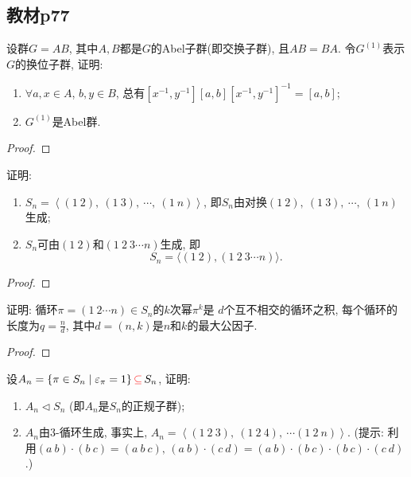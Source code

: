 \subsection{教材p77}

\begin{problem}
    设群$G = AB$, 其中$A, B$都是$G$的Abel子群(即交换子群),
且$AB = BA$. 令$G^{(1)}$表示$G$的换位子群, 证明: 
\begin{enumerate}[(1)]
    \item $\forall a, x \in A$, $b, y \in B$,
总有$[x^{-1}, y^{-1}][a, b][x^{-1}, y^{-1}]^{-1} = [a, b]$;
    \item $G^{(1)}$是Abel群.
\end{enumerate}
\end{problem}

\begin{proof}
    
\end{proof}

\begin{problem}
    证明: 
\begin{enumerate}[(1)]
    \item $S_{n} = \left\langle (1\:2),\: (1\:3),\: \cdots,\: (1\:n) \right\rangle$,
即$S_n$由对换$(1\:2),\: (1\:3),\: \cdots,\: (1\:n)$生成;
    \item $S_{n}$可由$(1\:2)$和$(1\:2\:3 \cdots n)$生成, 即
\[
    S_n = \big\langle (1\:2),(1\:2\:3 \cdots n) \big\rangle.
\]
\end{enumerate}
\end{problem}

\begin{proof}
    
\end{proof}

\begin{problem}
    证明: 循环$\pi = (1\:2 \cdots n) \in S_n$的$k$次幂$\pi^k$是
$d$个互不相交的循环之积, 每个循环的长度为$q = \frac nd$,
其中$d = (n, k)$是$n$和$k$的最大公因子.
\end{problem}

\begin{proof}
    
\end{proof}

\begin{problem}
    设$A_n= \{\pi \in S_n \mid \varepsilon_\pi = 1\} \,\textcolor{red}{\subseteq}\, S_n$,
证明: 
\begin{enumerate}[(1)]
    \item $A_n \lhd S_n$ (即$A_n$是$S_n$的正规子群);
    \item $A_n$由$3$-循环生成, 事实上, $A_n = \left\langle (1\:2\:3),\: (1\:2\:4),\: \cdots (1\:2\:n) \right\rangle$.
(提示: 利用$(a\:b) \cdot (b\:c) = (a\:b\:c),\, (a\:b) \cdot (c\:d) = (a\:b) \cdot (b\:c) \cdot (b\:c) \cdot (c\:d)$.)
\end{enumerate}
\end{problem}

